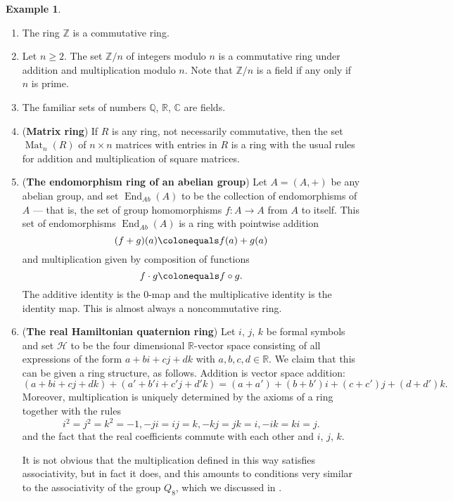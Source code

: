 \documentclass[12pt]{report}
\numberwithin{equation}{section}
\numberwithin{theorem}{chapter}
\theoremstyle{definition}
\newtheorem{example}[theorem]{Example}
\newtheorem*{basic properties}{Basic Properties}
\newtheorem*{Important Remark}{Important Remark}
\newcommand{\C}{\mathbb{C}}
\DeclareMathOperator{\Mat}{Mat}
\DeclareMathOperator{\End}{End}
\begin{document}
\begin{example}
\begin{enumerate}[itemsep=0.2em,leftmargin=20pt]
\item The ring $\mathbb{Z}$ is a commutative ring.

\item Let $n \geqslant 2$. The set $\mathbb{Z}/n$ of integers modulo $n$ is a commutative ring under addition and multiplication modulo $n$. Note that $\mathbb{Z}/n$ is a field if any only if $n$ is prime.

\item The familiar sets of numbers $\mathbb{Q}$, $\mathbb{R}$, $\C$ are fields.


\item ({\bf Matrix ring})\index{$\Mat_n(R)$} If $R$ is any ring, not necessarily commutative, then the set $\Mat_{n}(R)$ of $n \times n$ matrices with entries in $R$ is a ring with the usual rules for addition and multiplication of square matrices.

\item ({\bf The endomorphism ring of an abelian group}) Let $A = (A, +)$ be any abelian group, and set $\End_{Ab}(A)$ to be the collection of endomorphisms of $A$ --- that is, the set of group homomorphisms $f\!: A \longrightarrow A$ from $A$ to itself. 
This set of endomorphisms $\End_{Ab}(A)$ is a ring with pointwise addition 
$$(f + g)(a) \colonequals f(a) + g(a)$$ 
and multiplication given by composition of functions
$$f \cdot g \colonequals f \circ g.$$ 
The additive identity is the $0$-map and the multiplicative identity is the identity map. 
This is almost always a noncommutative ring.


\item ({\bf The real Hamiltonian quaternion ring}) Let $i$, $j$, $k$ be formal symbols and set $\mathcal{H}$ to be the four dimensional $\mathbb{R}$-vector space consisting of all expressions of the form $a + bi + cj + dk$ with $a,b,c,d \in \mathbb{R}$. We claim that this can be given a ring structure, as follows. Addition is vector space addition:
$$(a + bi + cj + dk) +(a' + b'i + c'j + d'k) = (a + a') + (b + b') i + (c + c')j + (d + d')k.$$
Moreover, multiplication is uniquely determined by the axioms of a ring together with the rules
$$i^2 = j^2 = k^2 = -1, -ji = ij = k, -kj = jk = i, -ik = ki = j.$$
and the fact that the real coefficients commute with each other and $i$, $j$, $k$.

It is not obvious that the multiplication defined in this way satisfies associativity, but in fact it does, and this amounts to conditions very similar to the associativity of the group $Q_8$, which we discussed in . 


\end{enumerate}
\end{example}
\end{document}
